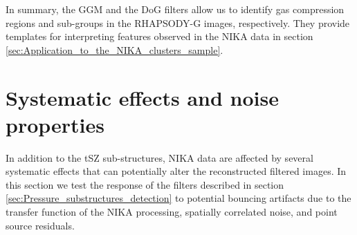 \documentclass[twocolumn,traditabstract]{aa}
\begin{document}
In summary, the GGM and the DoG filters allow us to identify gas compression regions and sub-groups in the RHAPSODY-G images, respectively. They provide templates for interpreting features observed in the NIKA data in section \ref{sec:Application_to_the_NIKA_clusters_sample}.

\section{Systematic effects and noise properties}\label{sec:Systematics_and_noise_properties}
In addition to the tSZ sub-structures, NIKA data are affected by several systematic effects that can potentially alter the reconstructed filtered images. In this section we test the response of the filters described in section \ref{sec:Pressure_substructures_detection} to potential bouncing artifacts due to the transfer function of the NIKA processing, spatially correlated noise, and point source residuals.
\end{document}
